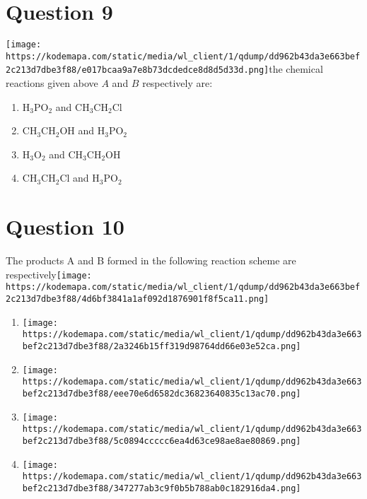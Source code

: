 \documentclass{article}
\begin{document}
\section*{Question 9}
\texttt{[image: https://kodemapa.com/static/media/wl\_client/1/qdump/dd962b43da3e663bef2c213d7dbe3f88/e017bcaa9a7e8b73dcdedce8d8d5d33d.png]}\newlineIn the chemical reactions given above \(A\) and \(B\) respectively are: 
\begin{enumerate}[label=(\alph*)]
\item \(\mathrm{H}_3 \mathrm{PO}_2\) and \(\mathrm{CH}_3 \mathrm{CH}_2 \mathrm{Cl}\)
\item \(\mathrm{CH}_3 \mathrm{CH}_2 \mathrm{OH}\) and \(\mathrm{H}_3 \mathrm{PO}_2\)
\item \(\mathrm{H}_3 \mathrm{O}_2\) and \(\mathrm{CH}_3 \mathrm{CH}_2 \mathrm{OH}\)
\item \(\mathrm{CH}_3 \mathrm{CH}_2 \mathrm{Cl}\) and \(\mathrm{H}_3 \mathrm{PO}_2\)
\end{enumerate}
\newpage
\section*{Question 10}
The products A and B formed in the following reaction scheme are respectively\texttt{[image: https://kodemapa.com/static/media/wl\_client/1/qdump/dd962b43da3e663bef2c213d7dbe3f88/4d6bf3841a1af092d1876901f8f5ca11.png]}\newline\newline
\begin{enumerate}[label=(\alph*)]
\item \texttt{[image: https://kodemapa.com/static/media/wl\_client/1/qdump/dd962b43da3e663bef2c213d7dbe3f88/2a3246b15ff319d98764dd66e03e52ca.png]}
\item \texttt{[image: https://kodemapa.com/static/media/wl\_client/1/qdump/dd962b43da3e663bef2c213d7dbe3f88/eee70e6d6582dc36823640835c13ac70.png]}
\item \texttt{[image: https://kodemapa.com/static/media/wl\_client/1/qdump/dd962b43da3e663bef2c213d7dbe3f88/5c0894ccccc6ea4d63ce98ae8ae80869.png]}
\item \texttt{[image: https://kodemapa.com/static/media/wl\_client/1/qdump/dd962b43da3e663bef2c213d7dbe3f88/347277ab3c9f0b5b788ab0c182916da4.png]}
\end{enumerate}
\newpage
\end{document}
